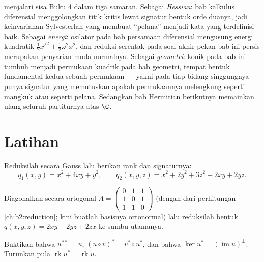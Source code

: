 \begin{remark}
 menjalari sisa Buku 4 dalam tiga
samaran. Sebagai \emph{Hessian}: bab kalkulus diferensial
menggolongkan titik kritis lewat signatur bentuk
orde duanya, jadi keinvarianan Sylvesterlah yang membuat
``pelana'' menjadi kata yang terdefinisi baik. Sebagai \emph{energi}:
osilator pada bab persamaan diferensial mengusung
energi kuadratik $\frac12x'^2 + \frac12\omega^2x^2$, dan
reduksi serentak pada soal akhir pekan bab ini
persis merupakan penyarian moda normalnya. Sebagai \emph{geometri}:
konik pada bab ini tumbuh menjadi permukaan kuadrik pada
bab geometri, tempat bentuk fundamental kedua sebuah
permukaan --- yakni  pada tiap bidang singgungnya --- punya
signatur yang memutuskan apakah permukaannya melengkung seperti mangkuk
atau seperti pelana. Sedangkan bab Hermitian berikutnya memainkan ulang seluruh
partiturnya atas $\C$.
\end{remark}

\section{Latihan}

\begin{exercise}[$\star$]\label{exo:b2:quadratic:1}
Reduksilah secara Gauss lalu berikan rank dan signaturnya:
\[
q_1(x,y) = x^2 + 4xy + y^2,
\qquad
q_2(x,y,z) = x^2 + 2y^2 + 3z^2 + 2xy + 2yz .
\]
\end{exercise}

\begin{exercise}[$\star$]\label{exo:b2:quadratic:2}
Diagonalkan secara ortogonal $A = \begin{pmatrix} 0 & 1 & 1\\ 1 & 0 &
1\\ 1 & 1 & 0\end{pmatrix}$ (dengan  dari
perhitungan \cref{ch:b2:reduction}; kini buatlah basisnya
ortonormal) lalu reduksilah bentuk $q(x,y,z) = 2xy + 2yz + 2zx$ ke
sumbu utamanya.
\end{exercise}

\begin{exercise}[$\star$]\label{exo:b2:quadratic:3}
Buktikan bahwa $u^{**} = u$, $(u \circ v)^* = v^* \circ u^*$, dan bahwa
$\ker u^* = (\operatorname{im} u)^{\perp}$. Turunkan pula
$\operatorname{rk} u^* = \operatorname{rk} u$.
\end{exercise}

